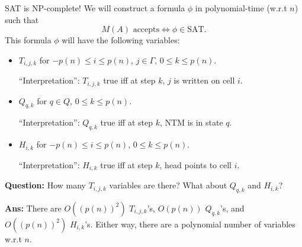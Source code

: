 \documentclass{beamer}
\begin{document}
\begin{frame}{SAT is NP-complete!}
We will construct a formula $\phi$ in polynomial-time (w.r.t $n$) such that
$$\text{$M(A)$ accepts} \Leftrightarrow \phi \in \mathrm{SAT}.$$
\pause
This formula $\phi$ will have the following variables:\pause
\begin{itemize}
    \item $T_{i, j, k}$ for $-p(n) \leq i \leq p(n)$, $j \in \Gamma$, $0 \leq k \leq p(n)$.\pause
    
    ``Interpretation'': $T_{i, j, k}$ true iff at step $k$, $j$ is written on cell $i$.\pause
    \item $Q_{q, k}$ for $q \in Q$, $0 \leq k \leq p(n)$.\pause
    
    ``Interpretation'': $Q_{q, k}$ true iff at step $k$, NTM is in state $q$.\pause
    \item $H_{i, k}$ for $-p(n) \leq i \leq p(n)$, $0 \leq k \leq p(n)$.\pause
    
    ``Interpretation'': $H_{i, k}$ true iff at step $k$, head points to cell $i$.\pause
\end{itemize}

\textbf{Question:} How many $T_{i, j, k}$ variables are there? What about $Q_{q, k}$ and $H_{i, k}$?

\pause

\textbf{Ans:} There are $O((p(n))^2)$ $T_{i, j, k}$'s, $O(p(n))$ $Q_{q, k}$'s, and $O((p(n))^2)$ $H_{i, k}$'s. \pause Either way, there are a polynomial number of variables w.r.t $n$.



\end{frame}
\end{document}
